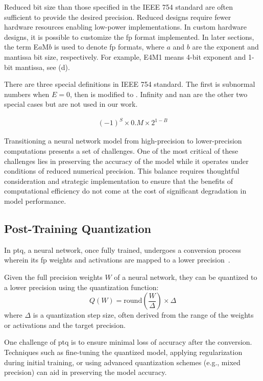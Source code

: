 Reduced bit size than those specified in the IEEE 754 standard are often sufficient to provide the desired precision. Reduced designs require fewer hardware resources enabling low-power implementations. In custom hardware designs, it is possible to customize the \gls{fp} format implemented. In later sections, the term E$a$M$b$ is used to denote \gls{fp} formats, where $a$ and $b$ are the exponent and mantissa bit size, respectively. For example, E4M1 means 4-bit exponent and 1-bit mantissa, see (d).

There are three special definitions in IEEE 754 standard. The first is subnormal numbers when $E=0$, then  is modified to . Infinity and \gls{nan} are the other two special cases but are not used in our work.

\begin{eqnarray} \label{eq:float_subnorm}
(-1)^{S} \times 0.M \times 2^{1-B}
\end{eqnarray}

Transitioning a neural network model from high-precision to lower-precision computations presents a set of challenges. One of the most critical of these challenges lies in preserving the accuracy of the model while it operates under conditions of reduced numerical precision. This balance requires thoughtful consideration and strategic implementation to ensure that the benefits of computational efficiency do not come at the cost of significant degradation in model performance.

\subsection{Post-Training Quantization}

In \gls{ptq}, a neural network, once fully trained, undergoes a conversion process wherein its \gls{fp} weights and activations are mapped to a lower precision~\cite{krishnamoorthi2018quantizing}.

Given the full precision weights \( W \) of a neural network, they can be quantized to a lower precision using the quantization function:
\begin{equation}
Q(W) = \text{round}\left(\frac{W}{\Delta}\right) \times \Delta
\end{equation}
where \( \Delta \) is a quantization step size, often derived from the range of the weights or activations and the target precision.

One challenge of \gls{ptq} is to ensure minimal loss of accuracy after the conversion. Techniques such as fine-tuning the quantized model, applying regularization during initial training, or using advanced quantization schemes (e.g., mixed precision) can aid in preserving the model accuracy.

